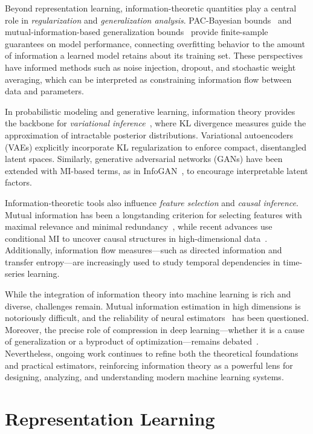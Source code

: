 \documentclass[11pt, oneside]{book}
\theoremstyle{plain}
\theoremstyle{definition}
\theoremstyle{remark}
\begin{document}
Beyond representation learning, information-theoretic quantities play a central role in \emph{regularization} and \emph{generalization analysis}. PAC-Bayesian bounds~\citep{mcallester1999pac} and mutual-information-based generalization bounds~\citep{xu2017information} provide finite-sample guarantees on model performance, connecting overfitting behavior to the amount of information a learned model retains about its training set. These perspectives have informed methods such as noise injection, dropout, and stochastic weight averaging, which can be interpreted as constraining information flow between data and parameters.

In probabilistic modeling and generative learning, information theory provides the backbone for \emph{variational inference}~\citep{jordan1999introduction,kingma2014auto}, where KL divergence measures guide the approximation of intractable posterior distributions. Variational autoencoders (VAEs) explicitly incorporate KL regularization to enforce compact, disentangled latent spaces. Similarly, generative adversarial networks (GANs) have been extended with MI-based terms, as in InfoGAN~\citep{chen2016infogan}, to encourage interpretable latent factors.

Information-theoretic tools also influence \emph{feature selection} and \emph{causal inference}. Mutual information has been a longstanding criterion for selecting features with maximal relevance and minimal redundancy~\cite{peng2005feature}, while recent advances use conditional MI to uncover causal structures in high-dimensional data~\cite{runge2019detecting}. Additionally, information flow measures—such as directed information and transfer entropy—are increasingly used to study temporal dependencies in time-series learning.

While the integration of information theory into machine learning is rich and diverse, challenges remain. Mutual information estimation in high dimensions is notoriously difficult, and the reliability of neural estimators~\cite{belghazi2018mutual} has been questioned. Moreover, the precise role of compression in deep learning—whether it is a cause of generalization or a byproduct of optimization—remains debated~\cite{saxe2019information}. Nevertheless, ongoing work continues to refine both the theoretical foundations and practical estimators, reinforcing information theory as a powerful lens for designing, analyzing, and understanding modern machine learning systems.


\section{Representation Learning}
\end{document}
